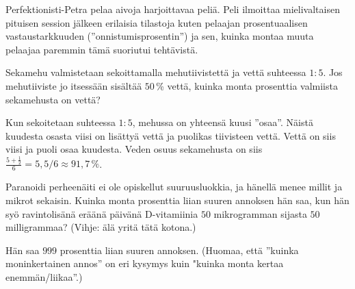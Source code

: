 \begin{tehtavasivu}
\begin{tehtava}
Perfektionisti-Petra pelaa aivoja harjoittavaa peliä. Peli ilmoittaa mielivaltaisen pituisen session jälkeen erilaisia tilastoja kuten pelaajan prosentuaalisen vastaustarkkuuden (''onnistumisprosentin'') ja sen, kuinka montaa muuta pelaajaa paremmin tämä suoriutui tehtävistä.
	\begin{vastaus}
	\end{vastaus}
\end{tehtava}

\begin{tehtava}
Sekamehu valmistetaan sekoittamalla mehutiivistettä ja vettä suhteessa $1:5$. Jos mehutiiviste jo itsessään sisältää $50$\,\% vettä, kuinka monta prosenttia valmiista sekamehusta on vettä?
	\begin{vastaus}
	Kun sekoitetaan suhteessa $1:5$, mehussa on yhteensä kuusi ''osaa''. Näistä kuudesta osasta viisi on lisättyä vettä ja puolikas tiivisteen vettä. Vettä on siis viisi ja puoli osaa kuudesta. Veden osuus sekamehusta on siis $\frac{5+\frac{1}{2}}{6}=5,5/6\approx91,7\,\%$.
	\end{vastaus}
\end{tehtava}

\begin{tehtava}
Paranoidi perheenäiti ei ole opiskellut suuruusluokkia, ja hänellä menee millit ja mikrot sekaisin. Kuinka monta prosenttia liian suuren annoksen hän saa, kun hän syö ravintolisänä eräänä päivänä D-vitamiinia $50$ mikrogramman sijasta $50$ milligrammaa? (Vihje: älä yritä tätä kotona.)
	\begin{vastaus}
 Hän saa $999$ prosenttia liian suuren annoksen. (Huomaa, että ''kuinka moninkertainen annos'' on eri kysymys kuin "kuinka monta kertaa enemmän/liikaa''.)
	\end{vastaus}
\end{tehtava}


\end{tehtavasivu}
